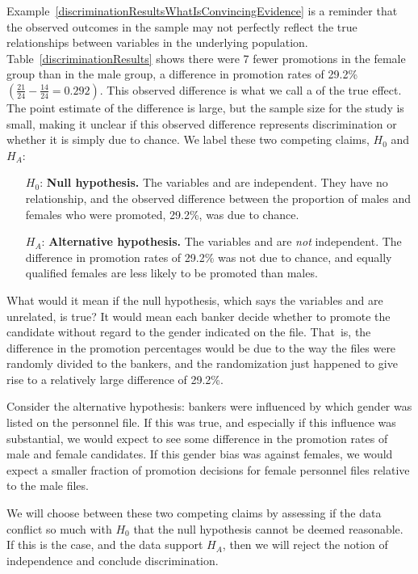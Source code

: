 Example~\ref{discriminationResultsWhatIsConvincingEvidence} is a reminder that the observed outcomes in the sample may not perfectly reflect the true relationships between variables in the underlying population. Table~\ref{discriminationResults} shows there were 7 fewer promotions in the female group than in the male group, a difference in promotion rates of 29.2\% $\left( \frac{21}{24} - \frac{14}{24} = 0.292 \right)$. This observed difference is what we call a  of the true effect. The point estimate of the difference is large, but the sample size for the study is small, making it unclear if this observed difference represents discrimination or whether it is simply due to chance. We label these two competing claims, $H_0$ and $H_A$:
\begin{itemize}
\setlength{\itemsep}{0mm}
\item[$H_0$:] \textbf{Null hypothesis.} The variables  and  are independent. They have no relationship, and the observed difference between the proportion of males and females who were promoted, 29.2\%, was due to chance.
\item[$H_A$:] \textbf{Alternative hypothesis.} The variables  and  are \emph{not} independent. The difference in promotion rates of 29.2\% was not due to chance, and equally qualified females are less likely to be promoted than males.
\end{itemize}

What would it mean if the null hypothesis, which says the variables  and  are unrelated, is true? It would mean each banker  decide whether to promote the candidate without regard to the gender indicated on the file. That~is, the difference in the promotion percentages would be due to the way the files were randomly divided to the bankers, and the randomization just happened to give rise to a relatively large difference of 29.2\%.

Consider the alternative hypothesis: bankers were influenced by which gender was listed on the personnel file. If this was true, and especially if this influence was substantial, we would expect to see some difference in the promotion rates of male and female candidates. If this gender bias was against females, we would expect a smaller fraction of promotion decisions for female personnel files relative to the male files.

We will choose between these two competing claims by assessing if the data conflict so much with $H_0$ that the null hypothesis cannot be deemed reasonable. If this is the case, and the data support $H_A$, then we will reject the notion of independence and conclude  discrimination.

